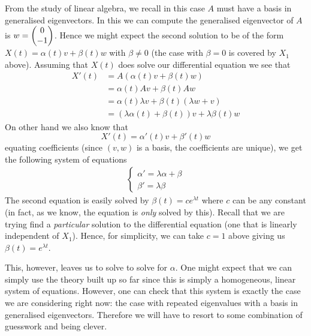 From the study of linear algebra, we recall in this case $A$ must have a basis in generalised eigenvectors. In this we can compute the generalised eigenvector of $A$ is $w = \begin{pmatrix} 0\\-1 \end{pmatrix}$. Hence we might expect the second solution to be of the form $X(t) = \alpha(t) v + \beta(t)w$ with $\beta \neq 0$ (the case with $\beta = 0$ is covered by $X_1$ above). Assuming that $X(t)$ does solve our differential equation we see that
\begin{align*}
    X'(t) &= A(\alpha(t)v + \beta(t)w)\\
    &= \alpha(t)Av + \beta(t)Aw\\
    &= \alpha(t)\lambda v + \beta(t)(\lambda w + v)\\
    &= (\lambda \alpha(t) + \beta(t))v + \lambda \beta(t) w
\end{align*}
On other hand we also know that
$$ X'(t) = \alpha'(t) v + \beta'(t) w $$
equating coefficients (since $(v, w)$ is a basis, the coefficients are unique), we get the following system of equations
\begin{align*}
    \begin{cases}
    \alpha' = \lambda \alpha + \beta\\
    \beta' = \lambda \beta
    \end{cases}
\end{align*}
The second equation is easily solved by $\beta(t) = c e^{\lambda t}$ where $c$ can be any constant (in fact, as we know, the equation is \textit{only} solved by this). Recall that we are trying find a \textit{particular} solution to the differential equation (one that is linearly independent of $X_1$). Hence, for simplicity, we can take $c = 1$ above giving us $\beta(t) = e^{\lambda t}$.

This, however, leaves us to solve to solve for $\alpha$. One might expect that we can simply use the theory built up so far since this is simply a homogeneous, linear system of equations. However, one can check that this system is exactly the case we are considering right now: the case with repeated eigenvalues with a basis in generalised eigenvectors. Therefore we will have to resort to some combination of guesswork and being clever. 

